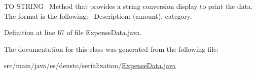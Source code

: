 TO S\+T\+R\+I\+NG~\newline
Method that provides a string conversion display to print the data. The format is the following\+:~\newline
Description\+: (amount), category. 

Definition at line 67 of file Expense\+Data.\+java.



The documentation for this class was generated from the following file\+:\begin{DoxyCompactItemize}
\item 
src/main/java/es/deusto/serialization/\hyperlink{_expense_data_8java}{Expense\+Data.\+java}\end{DoxyCompactItemize}
